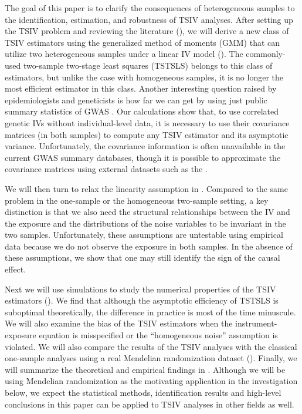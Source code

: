 \documentclass[preprint]{imsart}
\begin{document}
The goal of this paper is to clarify the consequences of heterogeneous
samples to the identification, estimation, and robustness of TSIV
analyses. After setting up the TSIV problem and reviewing the
literature (), we will derive a new class of
TSIV estimators using the generalized method of moments (GMM) that can
utilize two heterogeneous samples under a linear IV model
(). The commonly-used two-sample two-stage
least squares (TSTSLS) belongs to this class of estimators, but unlike
the case with homogeneous samples, it is no longer the most efficient
estimator in this class. Another
interesting question raised by epidemiologists and geneticists is how
far we can get by using just public summary statistics of GWAS
\citep{lawlor2016commentary,barbeira2016metaxcan}. Our calculations
show that, to use correlated genetic IVs without individual-level
data, it is necessary to use their covariance matrices (in both
samples) to compute any TSIV estimator and its asymptotic
variance. Unfortunately,
the covariance information is often unavailable in the current GWAS
summary databases, though it is possible to approximate the covariance
matrices using external datasets such as the \citet{10002015global}.

We will then turn to relax the linearity assumption in
. Compared
to the same problem in the one-sample or the homogeneous two-sample
setting, a key distinction is
that we also need the structural relationships between the IV and the
exposure and the distributions of the noise variables to be invariant
in the two samples. Unfortunately, these assumptions are untestable
using empirical data because we do not observe the exposure in both
samples. In the absence of these assumptions, we show that one may
still identify the sign of the causal effect.

Next we will use simulations to study the numerical properties of the TSIV estimators (). We find that although the
asymptotic efficiency of TSTSLS is suboptimal theoretically, the
difference in practice is most of the time minuscule. We will also
examine the bias of the TSIV estimators when the
instrument-exposure equation is misspecified or the ``homogeneous
noise'' assumption is violated. We will also compare the results of
the TSIV analyses with the classical one-sample analyses using a
real Mendelian randomization dataset ().
Finally, we will summarize the theoretical and empirical findings in
. Although we
will be using Mendelian randomization as the motivating application in
the investigation below,
we expect the statistical methods, identification results and high-level
conclusions in this paper can be applied to TSIV
analyses in other fields as well.
\end{document}
